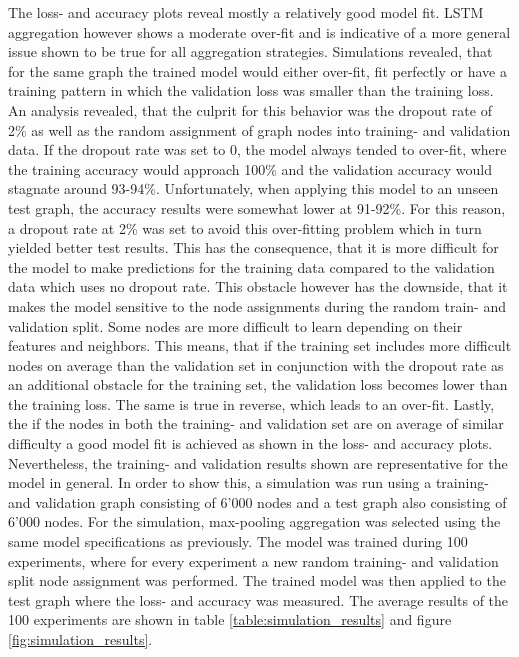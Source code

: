   The loss- and accuracy plots reveal mostly a relatively good model fit. LSTM
  aggregation however shows a moderate over-fit and is indicative of a more 
  general issue shown to be true for all aggregation strategies. Simulations
  revealed, that for the same graph the trained model would either over-fit,
  fit perfectly or have a training pattern in which the validation loss was
  smaller than the training loss. An analysis revealed, that the culprit for
  this behavior was the dropout rate of 2\% as well as the random assignment of
  graph nodes into training- and validation data. If the dropout rate was set
  to 0, the model always tended to over-fit, where the training accuracy would
  approach 100\% and the validation accuracy would stagnate around 93-94\%.
  Unfortunately, when applying this model to an unseen test graph, the accuracy
  results were somewhat lower at 91-92\%. For this reason, a dropout rate at
  2\% was set to avoid this over-fitting problem which in turn yielded better
  test results. This has the consequence, that it is more difficult for the
  model to make predictions for the training data compared to the validation
  data which uses no dropout rate. This obstacle however has the downside, that
  it makes the model sensitive to the node assignments during the random
  train- and validation split. Some nodes are more difficult to learn depending
  on their features and neighbors. This means, that if the training set
  includes more difficult nodes on average than the validation set in
  conjunction with the dropout rate as an additional obstacle for the training
  set, the validation loss becomes lower than the training loss. The same is
  true in reverse, which leads to an over-fit. Lastly, the if the nodes in both
  the training- and validation set are on average of similar difficulty a good
  model fit is achieved as shown in the loss- and accuracy plots. \\

  \noindent Nevertheless, the training- and validation results shown are 
  representative for the model in general. In order to show this, a simulation 
  was run using a training- and validation graph consisting of 6'000 nodes and 
  a test graph also consisting of 6'000 nodes. For the simulation, max-pooling 
  aggregation was selected using the same model specifications as previously. 
  The model was trained during 100 experiments, where for every experiment a 
  new random training- and validation split node assignment was performed. The
  trained model was then applied to the test graph where the loss- and accuracy
  was measured. The average results of the 100 experiments are shown in table
  \ref{table:simulation_results} and figure \ref{fig:simulation_results}. 

